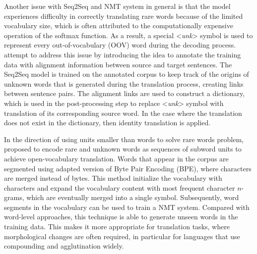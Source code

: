\documentclass[12pt]{extarticle}
\begin{document}
Another issue with Seq2Seq and NMT system in general is that the model experiences difficulty in correctly translating rare words because of the limited vocabulary size, which is often attributed to the computationally expensive operation of the softmax function. As a result, a special  \textless \textit{unk}\textgreater{} symbol is used to represent every out-of-vocabulary (OOV) word during the decoding process. \citep{luong-etal-2015-addressing} attempt to address this issue by introducing the idea to annotate the training data with alignment information between source and target sentences. The Seq2Seq model is trained on the annotated corpus to keep track of the origins of unknown words that is generated during the translation process, creating links between sentence pairs. The alignment links are used to construct a dictionary, which is used in the post-processing step to replace \textless \textit{unk}\textgreater{} symbol with translation of its corresponding source word. In the case where the translation does not exist in the dictionary, then identity translation is applied.

In the direction of using units smaller than words to solve rare words problem, \citep{sennrich-etal-2016-neural} proposed to encode rare and unknown words as sequences of subword units to achieve open-vocabulary translation. Words that appear in the corpus are segmented using adapted version of Byte Pair Encoding (BPE), where characters are merged instead of bytes. This method initialize the vocabulary with characters and expand the vocabulary content with most frequent character $n$-grams, which are eventually merged into a single symbol. Subsequently, word segments in the vocabulary can be used to train a NMT system. Compared with word-level approaches, this technique is able to generate unseen words in the training data. This makes it more appropriate for translation tasks, where morphological changes are often required, in particular for languages that use compounding and agglutination widely.
\end{document}
